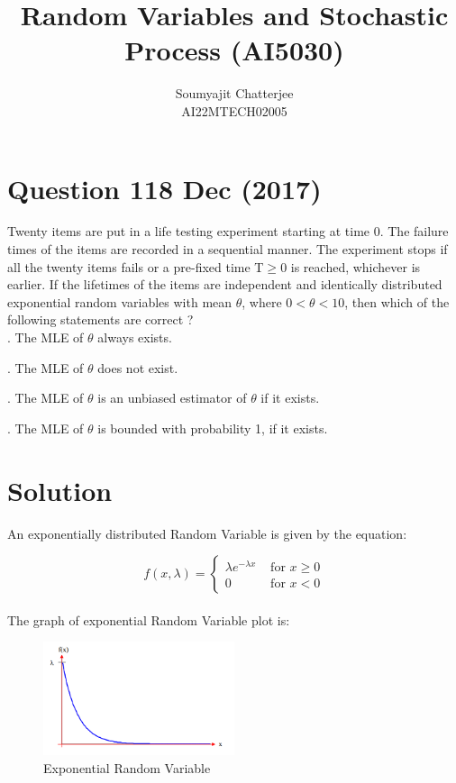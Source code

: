 \documentclass[12pt]{article}
\title{Random Variables and Stochastic Process (AI5030)}
\author{Soumyajit Chatterjee\\AI22MTECH02005 }
\begin{document}
\maketitle

\section*{Question 118 Dec (2017)}
Twenty items are put in a life testing experiment starting at time 0. The failure times of the items are recorded in a sequential manner. The experiment stops if all the twenty items fails or a pre-fixed time T$\geqslant 0$ is reached, whichever is earlier. If the lifetimes of the items are independent and identically distributed exponential random variables with mean $\theta$, where $0 < \theta < 10$, then which of the following statements are correct ?\\

. The MLE of $\theta$ always exists.

. The MLE of $\theta$ does not exist.

. The MLE of $\theta$ is an unbiased estimator of $\theta$ if it exists.

. The MLE of $\theta$ is bounded with probability 1, if it exists.

\section*{Solution}
An exponentially distributed Random Variable is given by the equation:

\begin{equation}
    f(x,\lambda) = 
        \begin{cases}
        \lambda e^{- \lambda x} & \text{ for } x \geqslant 0\\
        0 & \text{ for } x < 0
        \end{cases}
\end{equation}
\\
\noindent The graph of exponential Random Variable plot is:

\begin{figure}[h]
    \centering
    \includegraphics[width=0.5\textwidth]{exponential-distribution.png}
    \caption{Exponential Random Variable}
    \label{fig:erv}
\end{figure}
\end{document}
